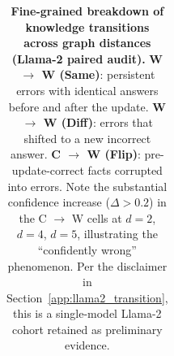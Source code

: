 \begin{table}[t]
\begin{tabular}{llcccccc}
\bottomrule
\end{tabular}
\caption{\textbf{Fine-grained breakdown of knowledge transitions across graph distances (Llama-2 paired audit).} \textbf{W $\to$ W (Same)}: persistent errors with identical answers before and after the update. \textbf{W $\to$ W (Diff)}: errors that shifted to a new incorrect answer. \textbf{C $\to$ W (Flip)}: pre-update-correct facts corrupted into errors. Note the substantial confidence increase ($\Delta > 0.2$) in the C $\to$ W cells at $d{=}2$, $d{=}4$, $d{=}5$, illustrating the ``confidently wrong'' phenomenon. Per the disclaimer in Section~\ref{app:llama2_transition}, this is a single-model Llama-2 cohort retained as preliminary evidence.}
\label{tab:transition_confidence}
\end{table}